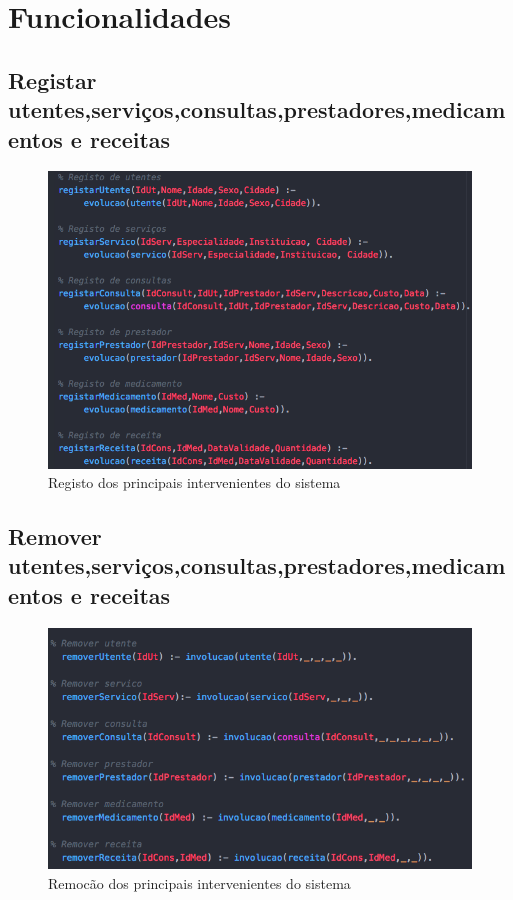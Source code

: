 \documentclass[25pt]{article}
\begin{document}
\newpage
\section{Funcionalidades}

\subsection{Registar utentes,serviços,consultas,prestadores,medicamentos e receitas}
\begin{figure}[H]
\centering\includegraphics[scale=0.5]{registo}
\caption{\label{fig:controller}Registo dos principais intervenientes do sistema}
\end{figure}


\subsection{Remover utentes,serviços,consultas,prestadores,medicamentos e receitas}
\begin{figure}[H]
\centering\includegraphics[scale=0.5]{Remocoes}
\caption{\label{fig:controller}Remocão dos principais intervenientes do sistema}
\end{figure}
\end{document}
